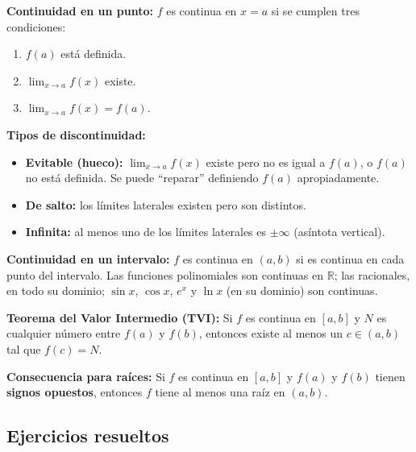 \documentclass[12pt, letterpaper]{article}
\begin{document}
\begin{cuadroteoria}
  \textbf{Continuidad en un punto:} $f$ es continua en $x = a$ si se cumplen tres condiciones:
  \begin{enumerate}
    \item $f(a)$ está definida.
    \item $\lim_{x \to a} f(x)$ existe.
    \item $\lim_{x \to a} f(x) = f(a)$.
  \end{enumerate}
\end{cuadroteoria}

\begin{cuadrosolucion}
  \textbf{Tipos de discontinuidad:}
  \begin{itemize}[leftmargin=*]
    \item \textbf{Evitable (hueco):} $\lim_{x \to a} f(x)$ existe pero no es igual a $f(a)$, o $f(a)$ no está definida. Se puede ``reparar'' definiendo $f(a)$ apropiadamente.
    \item \textbf{De salto:} los límites laterales existen pero son distintos.
    \item \textbf{Infinita:} al menos uno de los límites laterales es $\pm\infty$ (asíntota vertical).
  \end{itemize}
\end{cuadrosolucion}

\begin{cuadroadvertencia}
  \textbf{Continuidad en un intervalo:} $f$ es continua en $(a, b)$ si es continua en cada punto del intervalo. Las funciones polinomiales son continuas en $\mathbb{R}$; las racionales, en todo su dominio; $\sin x$, $\cos x$, $e^x$ y $\ln x$ (en su dominio) son continuas.
\end{cuadroadvertencia}

\begin{cuadroextra}
  \textbf{Teorema del Valor Intermedio (TVI):} Si $f$ es continua en $[a, b]$ y $N$ es cualquier número entre $f(a)$ y $f(b)$, entonces existe al menos un $c \in (a, b)$ tal que $f(c) = N$.

  \textbf{Consecuencia para raíces:} Si $f$ es continua en $[a, b]$ y $f(a)$ y $f(b)$ tienen \textbf{signos opuestos}, entonces $f$ tiene al menos una raíz en $(a, b)$.
\end{cuadroextra}

\subsection{Ejercicios resueltos}
\end{document}
